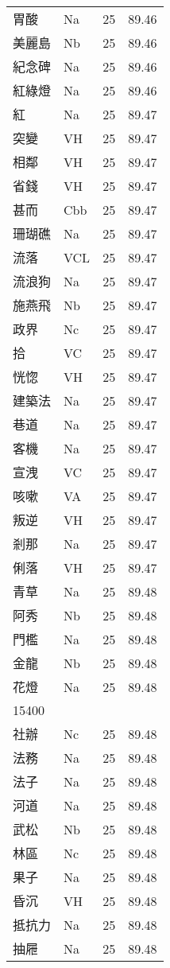 \documentclass[twocolumn]{book}
\begin{document}
\begin{supertabular}{llrr}
胃酸 & Na & 25 &  89.46\\
美麗島 & Nb & 25 &  89.46\\
紀念碑 & Na & 25 &  89.46\\
紅綠燈 & Na & 25 &  89.46\\
紅 & Na & 25 &  89.47\\
突變 & VH & 25 &  89.47\\
相鄰 & VH & 25 &  89.47\\
省錢 & VH & 25 &  89.47\\
甚而 & Cbb & 25 &  89.47\\
珊瑚礁 & Na & 25 &  89.47\\
流落 & VCL & 25 &  89.47\\
流浪狗 & Na & 25 &  89.47\\
施燕飛 & Nb & 25 &  89.47\\
政界 & Nc & 25 &  89.47\\
拾 & VC & 25 &  89.47\\
恍惚 & VH & 25 &  89.47\\
建築法 & Na & 25 &  89.47\\
巷道 & Na & 25 &  89.47\\
客機 & Na & 25 &  89.47\\
宣洩 & VC & 25 &  89.47\\
咳嗽 & VA & 25 &  89.47\\
叛逆 & VH & 25 &  89.47\\
剎那 & Na & 25 &  89.47\\
俐落 & VH & 25 &  89.47\\
青草 & Na & 25 &  89.48\\
阿秀 & Nb & 25 &  89.48\\
門檻 & Na & 25 &  89.48\\
金龍 & Nb & 25 &  89.48\\
花燈 & Na & 25 &  89.48\\
15400\\
社辦 & Nc & 25 &  89.48\\
法務 & Na & 25 &  89.48\\
法子 & Na & 25 &  89.48\\
河道 & Na & 25 &  89.48\\
武松 & Nb & 25 &  89.48\\
林區 & Nc & 25 &  89.48\\
果子 & Na & 25 &  89.48\\
昏沉 & VH & 25 &  89.48\\
抵抗力 & Na & 25 &  89.48\\
抽屜 & Na & 25 &  89.48\\

\end{supertabular}
\end{document}

